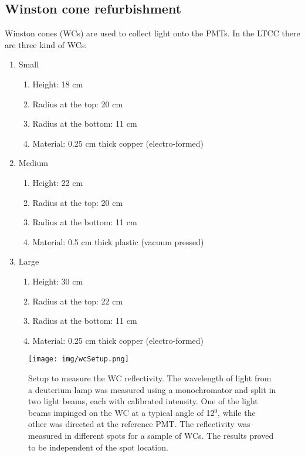 \subsection{Winston cone refurbishment}

Winston cones (WCs) are used to collect light onto the PMTs. In the LTCC there are three kind of WCs:

\begin{enumerate}

\item Small
	\begin{enumerate}
		\item Height: 18 cm
		\item Radius at the top: 20 cm
		\item Radius at the bottom: 11 cm
		\item Material: 0.25 cm thick copper (electro-formed)
	\end{enumerate}

	\item Medium
	\begin{enumerate}
		\item Height: 22 cm
		\item Radius at the top: 20 cm
		\item Radius at the bottom: 11 cm
		\item Material: 0.5 cm thick plastic (vacuum pressed)
	\end{enumerate}

	\item Large
	\begin{enumerate}
		\item Height: 30 cm
		\item Radius at the top: 22 cm
		\item Radius at the bottom: 11 cm
		\item Material: 0.25 cm thick copper (electro-formed)
	\end{enumerate}
\end{enumerate}

\begin{figure}
	\centering
	\texttt{[image: img/wcSetup.png]}
	\caption{Setup to measure the WC reflectivity. The wavelength of light from a deuterium lamp was measured using a monochromator and split in two
            light beams, each with calibrated intensity. One of the light beams impinged on the WC at a typical angle of 12$^0$,
            while the other was directed at the reference PMT. The reflectivity was measured in different spots for a sample of WCs.  The results proved
            to be independent of the spot location. }
	\label{fig:wcSetup}
\end{figure}

